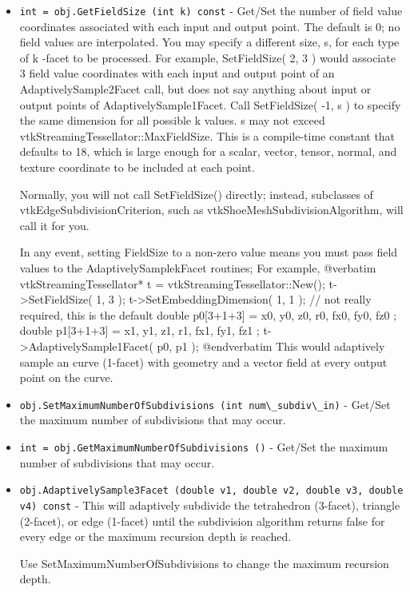 \begin{itemize}
\item  \verb|int = obj.GetFieldSize (int k) const| -  Get/Set the number of field value coordinates associated with each input and output point.
 The default is 0; no field values are interpolated.
 You may specify a different size,  s, for each type of  k -facet to be processed.
 For example,  SetFieldSize(  2,  3 ) would associate 3 field value coordinates
 with each input and output point of an  AdaptivelySample2Facet call,
 but does not say anything about input or output points of  AdaptivelySample1Facet. 
 Call  SetFieldSize(  -1,  s ) to specify the same dimension for all possible  k values.
  s may not exceed vtkStreamingTessellator::MaxFieldSize.
 This is a compile-time constant that defaults to 18, which is large enough for
 a scalar, vector, tensor, normal, and texture coordinate to be included at each point.

 Normally, you will not call  SetFieldSize() directly; instead, subclasses of
 vtkEdgeSubdivisionCriterion, such as vtkShoeMeshSubdivisionAlgorithm, will call it
 for you.

 In any event, setting  FieldSize to a non-zero value means you must pass field
 values to the  AdaptivelySamplekFacet routines; For example,
 @verbatim
    vtkStreamingTessellator* t = vtkStreamingTessellator::New();
    t->SetFieldSize( 1, 3 );
    t->SetEmbeddingDimension( 1, 1 ); // not really required, this is the default
    double p0[3+1+3] = { x0, y0, z0, r0, fx0, fy0, fz0 };
    double p1[3+1+3] = { x1, y1, z1, r1, fx1, fy1, fz1 };
    t->AdaptivelySample1Facet( p0, p1 );
 @endverbatim
 This would adaptively sample an curve (1-facet) with geometry and
 a vector field at every output point on the curve.

\item  \verb|obj.SetMaximumNumberOfSubdivisions (int num\_subdiv\_in)| -  Get/Set the maximum number of subdivisions that may occur.

\item  \verb|int = obj.GetMaximumNumberOfSubdivisions ()| -  Get/Set the maximum number of subdivisions that may occur.

\item  \verb|obj.AdaptivelySample3Facet (double v1, double v2, double v3, double v4) const| -  This will adaptively subdivide the tetrahedron (3-facet),
 triangle (2-facet), or edge (1-facet) until the subdivision
 algorithm returns false for every edge or the maximum recursion
 depth is reached.

 Use  SetMaximumNumberOfSubdivisions to change the maximum
 recursion depth.


\end{itemize}

